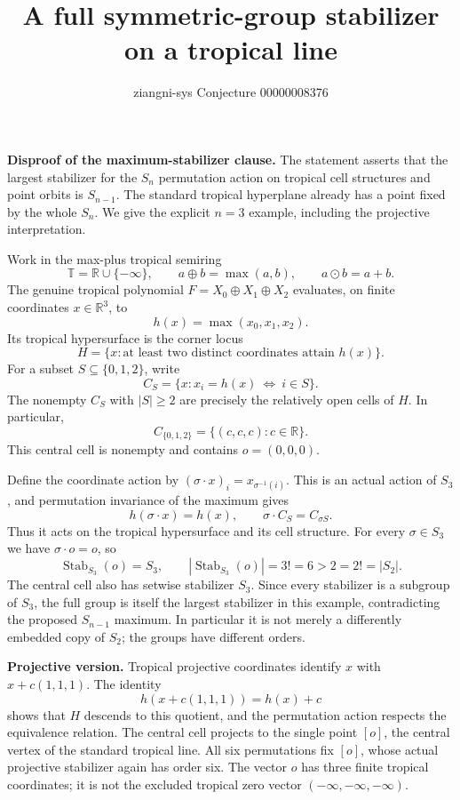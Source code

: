 \documentclass[11pt]{article}
\title{A full symmetric-group stabilizer on a tropical line}
\author{ziangni-sys \quad Conjecture 00000008376}
\date{}
\begin{document}
\maketitle
\vspace{-2em}
\textbf{Disproof of the maximum-stabilizer clause.} The statement asserts that the largest stabilizer for the $S_n$ permutation action on tropical cell structures and point orbits is $S_{n-1}$. The standard tropical hyperplane already has a point fixed by the whole $S_n$. We give the explicit $n=3$ example, including the projective interpretation.

Work in the max-plus tropical semiring
\[
\mathbb T=\mathbb R\cup\{-\infty\},\qquad a\oplus b=\max(a,b),\qquad a\odot b=a+b.
\]
The genuine tropical polynomial $F=X_0\oplus X_1\oplus X_2$ evaluates, on finite coordinates $x\in\mathbb R^3$, to
\[
 h(x)=\max(x_0,x_1,x_2).
\]
Its tropical hypersurface is the corner locus
\[
 H=\{x:\text{at least two distinct coordinates attain }h(x)\}.
\]
For a subset $S\subseteq\{0,1,2\}$, write
\[
 C_S=\{x: x_i=h(x)\ \Longleftrightarrow\ i\in S\}.
\]
The nonempty $C_S$ with $|S|\ge2$ are precisely the relatively open cells of $H$. In particular,
\[
 C_{\{0,1,2\}}=\{(c,c,c):c\in\mathbb R\}.
\]
This central cell is nonempty and contains $o=(0,0,0)$.

Define the coordinate action by $(\sigma\cdot x)_i=x_{\sigma^{-1}(i)}$. This is an actual action of $S_3$, and permutation invariance of the maximum gives
\[
 h(\sigma\cdot x)=h(x),\qquad \sigma\cdot C_S=C_{\sigma S}.
\]
Thus it acts on the tropical hypersurface and its cell structure. For every $\sigma\in S_3$ we have $\sigma\cdot o=o$, so
\[
 \operatorname{Stab}_{S_3}(o)=S_3,\qquad
 |\operatorname{Stab}_{S_3}(o)|=3!=6>2=2!=|S_2|.
\]
The central cell also has setwise stabilizer $S_3$. Since every stabilizer is a subgroup of $S_3$, the full group is itself the largest stabilizer in this example, contradicting the proposed $S_{n-1}$ maximum. In particular it is not merely a differently embedded copy of $S_2$; the groups have different orders.

\textbf{Projective version.} Tropical projective coordinates identify $x$ with $x+c(1,1,1)$. The identity
\[
 h(x+c(1,1,1))=h(x)+c
\]
shows that $H$ descends to this quotient, and the permutation action respects the equivalence relation. The central cell projects to the single point $[o]$, the central vertex of the standard tropical line. All six permutations fix $[o]$, whose actual projective stabilizer again has order six. The vector $o$ has three finite tropical coordinates; it is not the excluded tropical zero vector $(-\infty,-\infty,-\infty)$.
\end{document}
